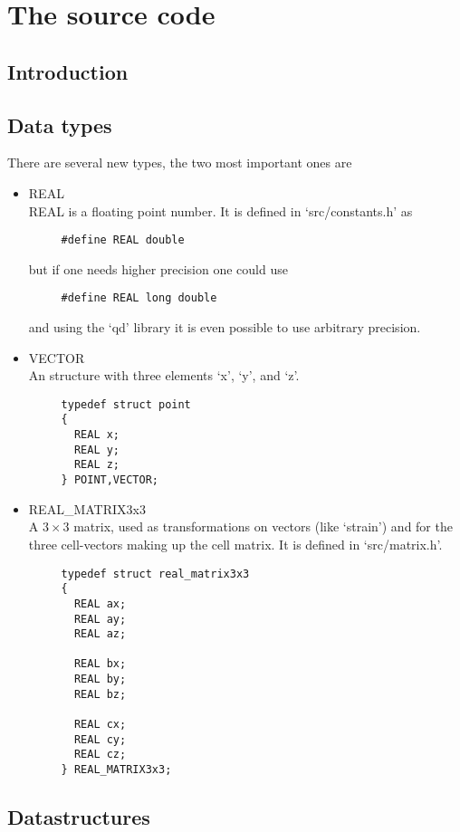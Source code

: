 \chapter{The source code}

\section{Introduction}

\section{Data types}

There are several new types, the two most important ones are
\begin{itemize}
\item{REAL}\\
REAL is a floating point number. It is defined in `src/constants.h' as
\begin{verbatim}
     #define REAL double
\end{verbatim}
but if one needs higher precision one could use
\begin{verbatim}
     #define REAL long double
\end{verbatim}
and using the `qd' library it is even possible to use arbitrary precision.
\item{VECTOR}\\
An structure with three elements `x', `y', and `z'.
\begin{verbatim}
     typedef struct point
     {
       REAL x;
       REAL y;
       REAL z;
     } POINT,VECTOR;
\end{verbatim}
\item{REAL\_MATRIX3x3}\\
A $3\times3$ matrix, used as transformations on vectors (like `strain') and for the three cell-vectors making up the cell matrix. It is defined in `src/matrix.h'.
\begin{verbatim}
     typedef struct real_matrix3x3
     {
       REAL ax;
       REAL ay;
       REAL az;

       REAL bx;
       REAL by;
       REAL bz;

       REAL cx;
       REAL cy;
       REAL cz;
     } REAL_MATRIX3x3;
\end{verbatim}
\end{itemize}

\section{Datastructures}

